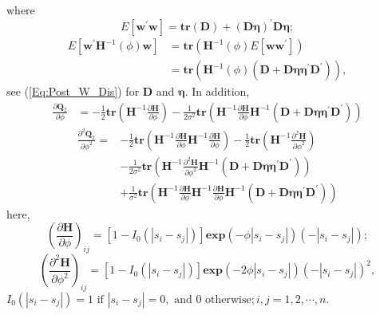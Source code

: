\documentclass[
]{article}
\begin{document}
where \[
E\left[\boldsymbol{w}^{\prime} \boldsymbol{w}\right]= \textbf{tr}(\bm{D}) + (\bm{D\eta})^\prime \bm{D\eta};
\] \[
\begin{aligned} E\left[\boldsymbol{w}^{\prime} \boldsymbol{H}^{-1}(\phi) \boldsymbol{w}\right] 
&= \textbf{tr}\left( \boldsymbol{H}^{-1}(\phi) E\left[ \boldsymbol{w}\boldsymbol{w}^{\prime} \right]\right)\\
&= \textbf{tr}\left( \boldsymbol{H}^{-1}(\phi) (\bm{D}  + \bm{D \eta\eta^\prime}\bm{D}^\prime)\right),
   \end{aligned}
\]see (\ref{Eq:Post_W_Dis}) for \(\bm{D}\) and \(\bm{\eta}.\) In
addition,
\begin{align} \frac{\partial \bm{Q}_2}{\partial \phi} &= -\frac{1}{2}\textbf{tr}\left( \bm{H}^{-1} \frac{\partial\bm{H}}{\partial\phi} \right) -\frac{1}{2\sigma^2} 
\textbf{tr}\left(\bm{H}^{-1}\frac{\partial \bm{H}}{\partial \phi}  \bm{H}^{-1}(\bm{D}  + \bm{D \eta\eta^\prime}\bm{D}^\prime) \right)
\end{align} \begin{equation}
\begin{aligned} \frac{\partial^{2} \boldsymbol{Q}_{2}}{\partial \phi^{2}}=&-\frac{1}{2} \textbf{tr}\left(\boldsymbol{H}^{-1} \frac{\partial \boldsymbol{H}}{\partial \phi} \boldsymbol{H}^{-1} \frac{\partial \boldsymbol{H}}{\partial \phi}\right)-\frac{1}{2} \textbf{tr}\left(\boldsymbol{H}^{-1} \frac{\partial^{2} \boldsymbol{H}}{\partial \phi^{2}}\right) \\ &-\frac{1}{2\sigma^2} \textbf{tr}\left(\boldsymbol{H}^{-1} \frac{\partial^{2} \boldsymbol{H}}{\partial \phi^{2}} \boldsymbol{H}^{-1}\left(\boldsymbol{D}+\boldsymbol{D} \boldsymbol{\eta} \boldsymbol{\eta}^{\prime} \boldsymbol{D}^{\prime}\right)\right) \\ & + \frac{1}{\sigma^2}\textbf{tr}\left(\boldsymbol{H}^{-1} \frac{\partial \boldsymbol{H}}{\partial \phi} \boldsymbol{H}^{-1} \frac{\partial \boldsymbol{H}}{\partial \phi} \boldsymbol{H}^{-1}\left(\boldsymbol{D}+\boldsymbol{D} \boldsymbol{\eta} \boldsymbol{\eta}^{\prime} \boldsymbol{D}^{\prime}\right)\right) \end{aligned}
\end{equation} here,
\[\left(\frac{\partial \bm{H}}{\partial \phi}\right)_{ij} = [1 - I_0(|s_i - s_j|)]\textbf{exp}(- \phi |s_i - s_j|)(- |s_i - s_j|);\]
\[\left(\frac{\partial^2 \bm{H}}{\partial \phi^2}\right)_{ij} = [1 - I_0(|s_i - s_j|)]\textbf{exp}(- 2\phi |s_i - s_j|)(- |s_i - s_j|)^2,\]
\(I_0(|s_i - s_j|) = 1 \mbox{ if } |s_i - s_j| = 0, \mbox{ and } 0 \mbox{ otherwise}; i, j = 1,2,\cdots, n.\)
\end{document}
